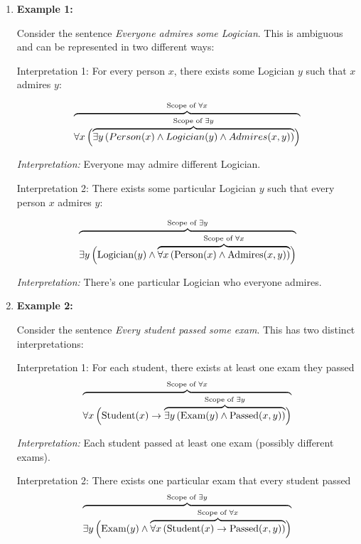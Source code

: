\documentclass[12pt,a4paper,openany]{article}
\begin{document}
\begin{enumerate}
\def\labelenumi{\arabic{enumi}.}
\item
  \textbf{Example 1:} 

  Consider the sentence \emph{Everyone admires some Logician}. This is
  ambiguous and can be represented in two different ways:

  Interpretation 1: For every person \(x\), there exists some Logician
  \(y\) such that \(x\) admires \(y\):

  \[
   {\color{black}\overbrace{\color{black}\forall x \, \Big(
   {\color{black}\overbrace{\color{black}\exists y \, (Person(x) \wedge Logician(y) \wedge Admires(x,y))}^{\color{black}\text{Scope of } \exists y}}
   \Big)}^{\color{black}\text{Scope of } \forall x}}
   \]

  \emph{Interpretation:} Everyone may admire different Logician.

  Interpretation 2: There exists some particular Logician \(y\) such
  that every person \(x\) admires \(y\):

  \[
   {\color{black}\overbrace{\color{black}\exists y \,
   \Big(
   \text{Logician}(y) \wedge
   {\color{black}\overbrace{\color{black}\forall x \,
   ( \text{Person}(x) \wedge \text{Admires}(x,y) )
   }^{\color{black}\text{Scope of } \forall x}}
   \Big)
   }^{\color{black}\text{Scope of } \exists y}}
   \]

  \emph{Interpretation:} There's one particular Logician who everyone
  admires.
\item
  \textbf{Example 2:}

  Consider the sentence \emph{Every student passed some exam}. This has
  two distinct interpretations:

  Interpretation 1: For each student, there exists at least one exam
  they passed \[
   {\color{black}\overbrace{\color{black}\forall x \, \Big(
   \text{Student}(x) \rightarrow
   {\color{black}\overbrace{\color{black}\exists y \, (\text{Exam}(y) \wedge \text{Passed}(x,y))}^{\color{black}\text{Scope of } \exists y}}
   \Big)}^{\color{black}\text{Scope of } \forall x}}
   \]

  \emph{Interpretation:} Each student passed at least one exam (possibly
  different exams).

  Interpretation 2: There exists one particular exam that every student
  passed \[
   {\color{black}\overbrace{\color{black}\exists y \,
   \Big(
   \text{Exam}(y) \wedge
   {\color{black}\overbrace{\color{black}\forall x \, 
   ( \text{Student}(x) \rightarrow \text{Passed}(x,y) )
   }^{\color{black}\text{Scope of } \forall x}}
   \Big)
   }^{\color{black}\text{Scope of } \exists y}}
   \]


\end{enumerate}
\end{document}
